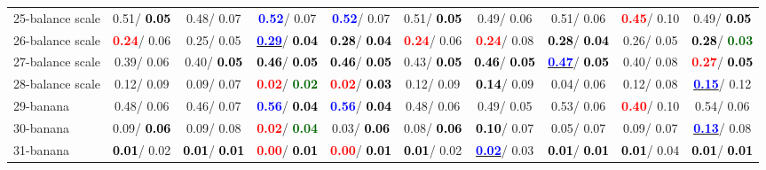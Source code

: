 \begin{table}[h]
\begin{center}
{\begin{tabular}{lc|c|c|c|c|c|c|c|c}
25-balance scale &   0.51/\textcolor{black}{\textbf{  0.05}} &   0.48/  0.07 & \textcolor{blue}{\textbf{  0.52}}/  0.07 & \textcolor{blue}{\textbf{  0.52}}/  0.07 &   0.51/\textcolor{black}{\textbf{  0.05}} &   0.49/  0.06 &   0.51/  0.06 & \textcolor{red}{\textbf{  0.45}}/  0.10 &   0.49/\textcolor{black}{\textbf{  0.05}} \\
26-balance scale & \textcolor{red}{\textbf{  0.24}}/  0.06 &   0.25/  0.05 & \underline{\textcolor{blue}{\textbf{  0.29}}}/\textcolor{black}{\textbf{  0.04}} & \textcolor{black}{\textbf{  0.28}}/\textcolor{black}{\textbf{  0.04}} & \textcolor{red}{\textbf{  0.24}}/  0.06 & \textcolor{red}{\textbf{  0.24}}/  0.08 & \textcolor{black}{\textbf{  0.28}}/\textcolor{black}{\textbf{  0.04}} &   0.26/  0.05 & \textcolor{black}{\textbf{  0.28}}/\textcolor{darkgreen}{\textbf{  0.03}} \\
27-balance scale &   0.39/  0.06 &   0.40/\textcolor{black}{\textbf{  0.05}} & \textcolor{black}{\textbf{  0.46}}/\textcolor{black}{\textbf{  0.05}} & \textcolor{black}{\textbf{  0.46}}/\textcolor{black}{\textbf{  0.05}} &   0.43/\textcolor{black}{\textbf{  0.05}} & \textcolor{black}{\textbf{  0.46}}/\textcolor{black}{\textbf{  0.05}} & \underline{\textcolor{blue}{\textbf{  0.47}}}/\textcolor{black}{\textbf{  0.05}} &   0.40/  0.08 & \textcolor{red}{\textbf{  0.27}}/\textcolor{black}{\textbf{  0.05}} \\
28-balance scale &   0.12/  0.09 &   0.09/  0.07 & \textcolor{red}{\textbf{  0.02}}/\textcolor{darkgreen}{\textbf{  0.02}} & \textcolor{red}{\textbf{  0.02}}/\textcolor{black}{\textbf{  0.03}} &   0.12/  0.09 & \textcolor{black}{\textbf{  0.14}}/  0.09 &   0.04/  0.06 &   0.12/  0.08 & \underline{\textcolor{blue}{\textbf{  0.15}}}/  0.12 \\ \hline
29-banana &   0.48/  0.06 &   0.46/  0.07 & \textcolor{blue}{\textbf{  0.56}}/\textcolor{black}{\textbf{  0.04}} & \textcolor{blue}{\textbf{  0.56}}/\textcolor{black}{\textbf{  0.04}} &   0.48/  0.06 &   0.49/  0.05 &   0.53/  0.06 & \textcolor{red}{\textbf{  0.40}}/  0.10 &   0.54/  0.06 \\
30-banana &   0.09/\textcolor{black}{\textbf{  0.06}} &   0.09/  0.08 & \textcolor{red}{\textbf{  0.02}}/\textcolor{darkgreen}{\textbf{  0.04}} &   0.03/\textcolor{black}{\textbf{  0.06}} &   0.08/\textcolor{black}{\textbf{  0.06}} & \textcolor{black}{\textbf{  0.10}}/  0.07 &   0.05/  0.07 &   0.09/  0.07 & \underline{\textcolor{blue}{\textbf{  0.13}}}/  0.08 \\
31-banana & \textcolor{black}{\textbf{  0.01}}/  0.02 & \textcolor{black}{\textbf{  0.01}}/\textcolor{black}{\textbf{  0.01}} & \textcolor{red}{\textbf{  0.00}}/\textcolor{black}{\textbf{  0.01}} & \textcolor{red}{\textbf{  0.00}}/\textcolor{black}{\textbf{  0.01}} & \textcolor{black}{\textbf{  0.01}}/  0.02 & \underline{\textcolor{blue}{\textbf{  0.02}}}/  0.03 & \textcolor{black}{\textbf{  0.01}}/\textcolor{black}{\textbf{  0.01}} & \textcolor{black}{\textbf{  0.01}}/  0.04 & \textcolor{black}{\textbf{  0.01}}/\textcolor{black}{\textbf{  0.01}} \\

\end{tabular}}
\end{center}
\end{table}
